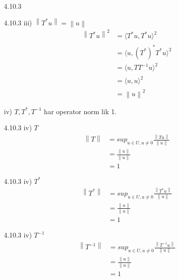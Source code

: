 \documentclass[a4paper,norsk]{article}
\begin{document}
\begin{oppgavebox}{4.10.3}{}
\begin{proofbox}{4.10.3 iii) $ \left\lVert T^*u \right\rVert = \left\lVert u \right\rVert  $ }{}
    \begin{align*}
        \left\lVert T^*u \right\rVert ^2 &= \langle T^*u, T^*u \rangle_{  }^2 \\
        &= \langle u, \left( T^* \right) ^* T^*u \rangle_{  }  ^2 \\
        &= \langle u, TT^{-1}u \rangle_{  } ^2 \\
        &= \langle u, u \rangle_{  }^2\\
        &= \left\lVert u \right\rVert ^2 
    \end{align*}
\end{proofbox}
 

iv) $ T, T^*, T^{-1} $ har operator norm lik 1.

\begin{proofbox}{4.10.3 iv) $ T $ }{}
    \begin{align*}
        \left\lVert T \right\rVert &= sup_{u \in U, u \neq 0} \frac{ \left\lVert Tu \right\rVert  }{ \left\lVert u \right\rVert  }\\
        &= \frac{ \left\lVert u \right\rVert }{ \left\lVert u \right\rVert  }\\
        &= 1
    \end{align*}
\end{proofbox}

\begin{proofbox}{4.10.3 iv) $ T^* $ }{}
    \begin{align*}
        \left\lVert T^* \right\rVert &= sup_{u \in U, u \neq 0} \frac{ \left\lVert T^*u \right\rVert  }{ \left\lVert u \right\rVert  }\\
        &= \frac{ \left\lVert u \right\rVert }{ \left\lVert u \right\rVert  }\\
        &= 1
    \end{align*}
\end{proofbox}

\begin{proofbox}{4.10.3 iv) $ T^{-1} $ }{}
    \begin{align*}
        \left\lVert T^{-1} \right\rVert &= sup_{u \in U, u \neq 0} \frac{ \left\lVert T^{-1}u \right\rVert  }{ \left\lVert u \right\rVert  }\\
        &= \frac{ \left\lVert u \right\rVert }{ \left\lVert u \right\rVert  }\\
        &= 1
    \end{align*}
\end{proofbox}
\end{oppgavebox}
\end{document}
